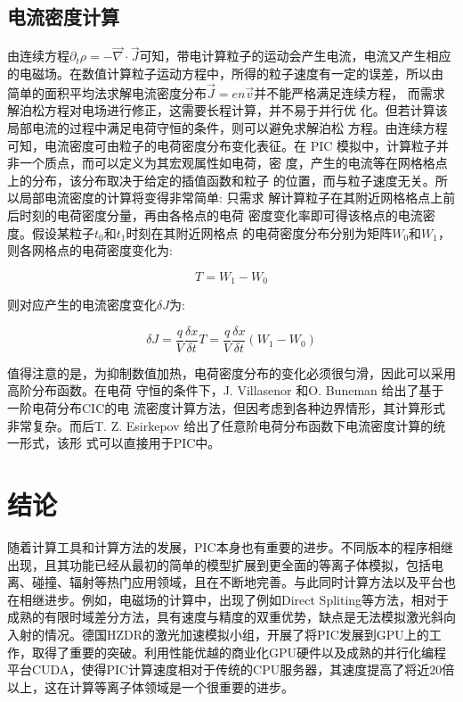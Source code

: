    




   
 



\subsection{电流密度计算}

由连续方程${\partial}_t \rho = - \vec{\nabla} \cdot \vec{J}$可知，带电计算粒子的运动会产生电流，电流又产生相应的电磁场。在数值计算粒子运动方程中，所得的粒子速度有一定的误差，所以由
简单的面积平均法求解电流密度分布$\vec{J}=en\vec{v}$并不能严格满足连续方程，
而需求解泊松方程对电场进行修正\cite{hockney1988computer}，这需要长程计算，并不易于并行优
化。但若计算该局部电流的过程中满足电荷守恒的条件，则可以避免求解泊松
方程。由连续方程可知，电流密度可由粒子的电荷密度分布变化表征。在
PIC 模拟中，计算粒子并非一个质点，而可以定义为其宏观属性如电荷，密
度，产生的电流等在网格格点上的分布，该分布取决于给定的插值函数和粒子
的位置，而与粒子速度无关。所以局部电流密度的计算将变得非常简单: 只需求
解计算粒子在其附近网格格点上前后时刻的电荷密度分量，再由各格点的电荷
密度变化率即可得该格点的电流密度。假设某粒子$t_0$和$t_1$时刻在其附近网格点
的电荷密度分布分别为矩阵$W_0$和$W_1$，则各网格点的电荷密度变化为:


\begin{equation}
T=W_1-W_0
\end{equation}

则对应产生的电流密度变化$\delta J$为:

\begin{equation}
\delta J =\frac{q}{V} \frac{\delta x}{\delta t} T = \frac{q}{V} \frac{\delta x}{\delta t}(W_1-W_0)
\end{equation}


值得注意的是，为抑制数值加热，电荷密度分布的变化必须很匀滑，因此可以采用高阶分布函数。在电荷
守恒的条件下，J. Villasenor 和O. Buneman 给出了基于一阶电荷分布CIC的电
流密度计算方法\cite{villasenor1992rigorous}，但因考虑到各种边界情形，其计算形式非常复杂。而后T.
Z. Esirkepov 给出了任意阶电荷分布函数下电流密度计算的统一形式\cite{esirkepov2001exact}，该形
式可以直接用于PIC中。



\section{结论}

随着计算工具和计算方法的发展，PIC本身也有重要的进步。不同版本的程序相继出现，且其功能已经从最初的简单的模型扩展到更全面的等离子体模拟，包括电离、碰撞、辐射等热门应用领域，且在不断地完善。与此同时计算方法以及平台也在相继进步。例如，电磁场的计算中，出现了例如Direct Spliting\cite{sentoku2008numerical}等方法，相对于成熟的有限时域差分方法，具有速度与精度的双重优势，缺点是无法模拟激光斜向入射的情况。德国HZDR的激光加速模拟小组，开展了将PIC发展到GPU上的工作，取得了重要的突破。利用性能优越的商业化GPU硬件以及成熟的并行化编程平台CUDA，使得PIC计算速度相对于传统的CPU服务器，其速度提高了将近20倍以上，这在计算等离子体领域是一个很重要的进步。



